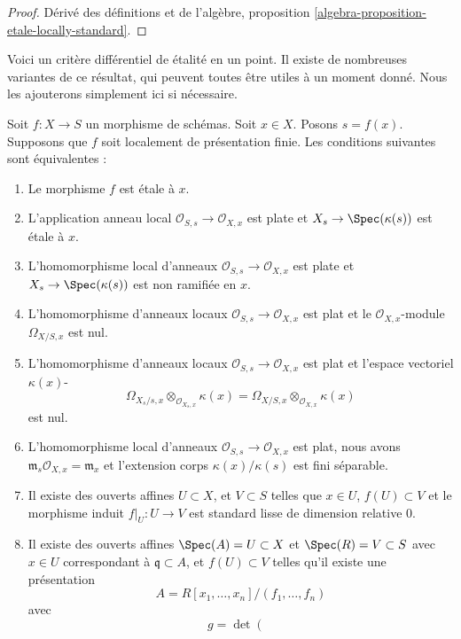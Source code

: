 \begin{proof}
Dérivé des définitions
et de l'algèbre, proposition \ref{algebra-proposition-etale-locally-standard}.
\end{proof}

\noindent
Voici un critère différentiel de étalité en un point. Il existe
de nombreuses variantes de ce résultat, qui peuvent
toutes être utiles à un moment donné. Nous les ajouterons simplement ici
si nécessaire.

\begin{lemma}
\label{lemma-etale-at-point}
Soit $f : X \to S$ un morphisme de schémas. Soit $x \in X$.
Posons $s = f(x)$.
Supposons que $f$
soit localement de présentation finie. Les conditions
suivantes sont équivalentes :
\begin{enumerate}
\item Le morphisme $f$ est étale à $x$.
\item L'application anneau local $\mathcal{O}_{S, s} \to \mathcal{O}_{X, x}$ est plate et
$X_s \to \Spec(\kappa(s))$ est étale à $x$.
\item L'homomorphisme local d'anneaux $\mathcal{O}_{S, s} \to \mathcal{O}_{X, x}$ est plate
et $X_s \to \Spec(\kappa(s))$ est non ramifiée en $x$.
\item L'homomorphisme d'anneaux locaux $\mathcal{O}_{S, s} \to \mathcal{O}_{X, x}$ est
plat et le $\mathcal{O}_{X, x}$-module $\Omega_{X/S, x}$ est
nul.
\item L'homomorphisme d'anneaux locaux $\mathcal{O}_{S, s} \to \mathcal{O}_{X, x}$ est plat et
l'espace vectoriel $\kappa(x)$-
$$
\Omega_{X_s/s, x} \otimes_{\mathcal{O}_{X_s, x}} \kappa(x) =
\Omega_{X/S, x} \otimes_{\mathcal{O}_{X, x}} \kappa(x)
$$
est nul.
\item L'homomorphisme local d'anneaux $\mathcal{O}_{S, s} \to \mathcal{O}_{X, x}$
est plat, nous avons $\mathfrak m_s\mathcal{O}_{X, x} = \mathfrak m_x$ et l'extension
corps $\kappa(x)/\kappa(s)$ est fini
séparable.
\item Il existe des ouverts affines $U \subset X$,
et $V \subset S$ telles que $x \in U$, $f(U) \subset V$ et le morphisme
induit $f|_U : U \to V$ est standard lisse de dimension
relative $0$.
\item Il existe des ouverts affines $\Spec(A) = U \subset X$
et $\Spec(R) = V \subset S$ avec $x \in U$ correspondant
à $\mathfrak q \subset A$, et $f(U) \subset V$ telles qu'il
existe une présentation
$$
A = R[x_1, \ldots, x_n]/(f_1, \ldots, f_n)
$$
avec
$$
g =
\det
\left(
\begin{matrix}

\end{matrix}$$
\end{enumerate}
\end{lemma}
